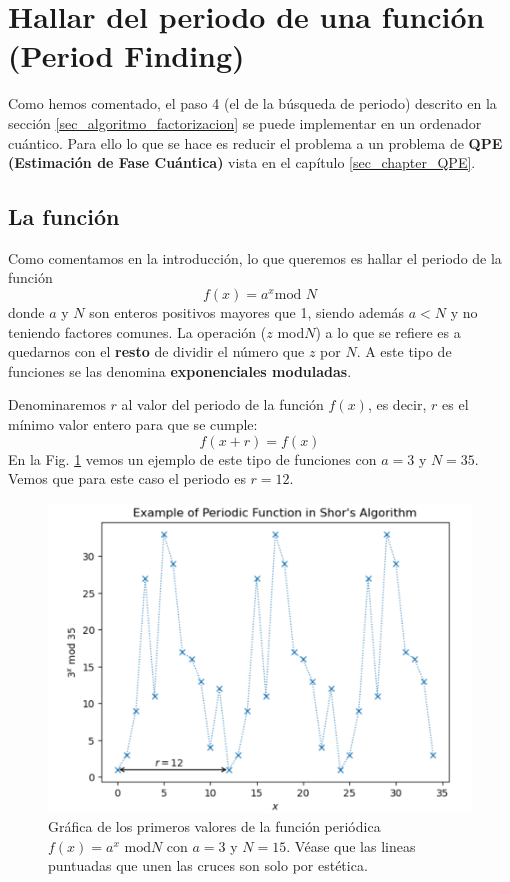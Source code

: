 \documentclass[a4paper,11pt]{book} %
\numberwithin{equation}{chapter}
\begin{document}
\section{Hallar del periodo de una función (Period Finding)}

Como hemos comentado, el paso 4 (el de la búsqueda de periodo) descrito en la sección \ref{sec_algoritmo_factorizacion} se puede implementar en un ordenador cuántico. Para ello lo que se hace es reducir el problema a un problema de \textbf{QPE (Estimación de Fase Cuántica)} vista en el capítulo \ref{sec_chapter_QPE}.



\subsection{La función}

Como comentamos en la introducción, lo que queremos es hallar el periodo de la función 
	\begin{equation}
	f(x) = a^x \text{mod } N
	\end{equation}
donde $a$ y $N$ son enteros positivos mayores que 1, siendo además $a < N$ y no teniendo factores comunes. La operación ($z$ mod$N$) a lo que se refiere es a quedarnos con el \textbf{resto} de dividir el número que $z$ por $N$. A este tipo de funciones se las denomina \textbf{exponenciales moduladas}.

Denominaremos $r$ al valor del periodo de la función $f(x)$, es decir, $r$ es el mínimo valor entero para que se cumple:
	\begin{equation}
	f(x+r) = f(x)
	\end{equation}
En la Fig. \ref{Fig_Ejemplo-Funcion-Periodica} vemos un ejemplo de este tipo de funciones con $a = 3$ y $N=35$. Vemos que para este caso el periodo es $r = 12$.


\begin{figure}[h]
\centering 
\includegraphics[width=0.7\linewidth]{Figuras/Fig-Ejemplo-Funcion-Periodica.png}
\caption{Gráfica de los primeros valores de la función periódica $f(x) = a^x \text{ mod} N$ con $a=3$ y $N=15$. Véase que las lineas puntuadas que unen las cruces son solo por estética.}
\label{Fig_Ejemplo-Funcion-Periodica}
\end{figure}
\end{document}
